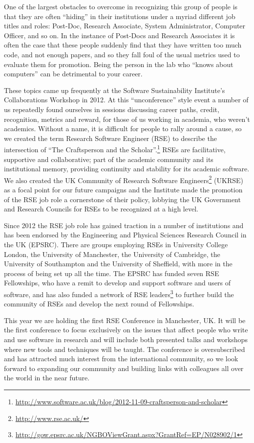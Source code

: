 \documentclass[a4paper,UKenglish]{dagrep}
\begin{document}
One of the largest obstacles to overcome in recognizing this group of people is that they are often ``hiding'' in their institutions under a myriad different job titles and roles: Post-Doc, Research Associate, System Administrator, Computer Officer, and so on. In the instance of Post-Docs and Research Associates it is often the case that these people suddenly find that they have written too much code, and not enough papers, and so they fall foul of the usual metrics used to evaluate them for promotion. Being the person in the lab who ``knows about computers'' can be detrimental to your career.

These topics came up frequently at the Software Sustainability Institute's Collaborations Workshop in 2012. At this ``unconference'' style event a number of us repeatedly found ourselves in sessions discussing career paths, credit, recognition, metrics and reward, for those of us working in academia, who weren't academics. Without a name, it is difficult for people to rally around a cause, so we created the term Research Software Engineer (RSE) to describe the intersection of ``The Craftsperson and the Scholar''.\footnote{\url{http://www.software.ac.uk/blog/2012-11-09-craftsperson-and-scholar}}
RSEs are facilitative, supportive and collaborative; part of the academic community and its institutional memory, providing continuity and stability for its academic software. We also created the UK Community of Research Software Engineers\footnote{\url{http://www.rse.ac.uk/}} (UKRSE) as a focal point for our future campaigns and the Institute made the promotion of the RSE job role a cornerstone of their policy, lobbying the UK Government and Research Councils for RSEs to be recognized at a high level.

Since 2012 the RSE job role has gained traction in a number of institutions and has been endorsed by the Engineering and Physical Sciences Research Council in the UK (EPSRC). There are groups employing RSEs in University College London, the University of Manchester, the University of Cambridge, the University of Southampton and the University of Sheffield, with more in the process of being set up all the time. The EPSRC has funded seven RSE Fellowships, who have a remit to develop and support software and users of software, and has also funded a network of RSE leaders\footnote{\url{http://gow.epsrc.ac.uk/NGBOViewGrant.aspx?GrantRef=EP/N028902/1}} to further build the community of RSEs and develop the next round of Fellowships.

This year we are holding the first RSE Conference in Manchester, UK. It will be the first conference to focus exclusively on the issues that affect people who write and use software in research and will include both presented talks and workshops where new tools and techniques will be taught. The conference is oversubscribed and has attracted much interest from the international community, so we look forward to expanding our community and building links with colleagues all over the world in the near future.
\end{document}
